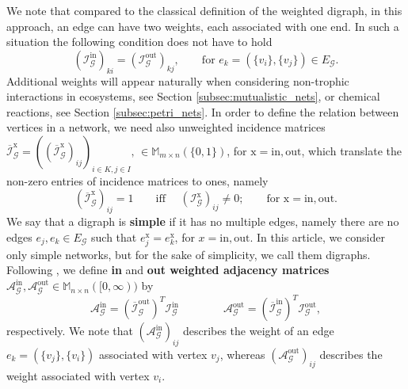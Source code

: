 \documentclass[a4paper,12pt]{article}
\theoremstyle{definition}
\theoremstyle{remark}
\newcommand{\mG}{\mathcal{G}}
\newcommand{\EG}{E_{\mathcal{G}}}
\newcommand{\tin}{\mathrm{in}}
\newcommand{\out}{\mathrm{out}}
\newcommand{\inci}{\mathcal{I}^{\tin}}
\newcommand{\inco}{\mathcal{I}^{\out}}
\begin{document}
We note that compared to the classical definition of the weighted digraph, in this approach, an edge can have two weights, each associated with one end. In such a situation the following condition does not have to hold
\begin{equation}\label{eq:multi-weights}
(\inci_{\mG})_{ki}= (\inco_{\mG})_{kj},\qquad \text{for } e_k=(\{v_i\},\{v_j\})\in \EG.
\end{equation}
Additional weights will appear naturally when considering non-trophic interactions in ecosystems, see Section \ref{subsec:mutualistic_nets}, or chemical reactions, see Section \ref{subsec:petri_nets}. In order to define the relation between  vertices in a network, we need also  unweighted incidence matrices $\overline{\mathcal{I}}_{\mG}^{\mathrm{x}}=((\overline{\mathcal{I}}_{\mG}^{\mathrm{x}})_{ij})_{i\in K,j\in I},\, \in \mathbb{M}_{m\times n}(\{0,1\})$, for $\mathrm{x}=\mathrm{in},\mathrm{out}$, which translate the non-zero entries of incidence matrices to ones, namely
\begin{equation*}
(\overline{\mathcal{I}}_{\mG}^{\mathrm{x}})_{ij}=1 \qquad \text{iff }\quad (\mathcal{I}_{\mG}^{\mathrm{x}})_{ij}\neq 0;\qquad \text{for }\mathrm{x}=\mathrm{in},\mathrm{out}.
\end{equation*}
We say that a digraph is \textbf{simple} if it has no multiple edges, namely there are no edges $e_j,e_k\in E_{\mG}$ such that $e_j^{\textrm{x}}=e_k^{\textrm{x}}$, for $x=\tin,\out$. In this article, we consider only simple networks, but for the sake of simplicity, we call them digraphs.  Following \protect\cite[Eq.~2.7]{Mugnolo2013}, we define \textbf{in} and \textbf{out weighted adjacency matrices} $\mathcal{A}_{\mG}^{\tin},\mathcal{A}_{\mG}^{\textrm{out}} \in \mathbb{M}_{n\times n}([0,\infty)) $  by
\begin{equation}\label{eq:adj_and_inc}
\mathcal{A}_{\mG}^{\tin}=(\overline{\mathcal{I}}^{\textrm{out}}_{\mG})^T \inci_{\mG}\qquad \qquad \mathcal{A}_{\mG}^{\out}=(\overline{\mathcal{I}}^{\textrm{in}}_{\mG})^T \inco_{\mG},
\end{equation}
respectively. We note that $(\mathcal{A}_{\mG}^{\tin})_{ij}$ describes the weight of an edge $e_k=(\{v_j\},\{v_i\})$ associated with vertex $v_j$, 
whereas $(\mathcal{A}_{\mG}^{\out})_{ij}$ describes the weight associated with vertex $v_i$. %
\end{document}

